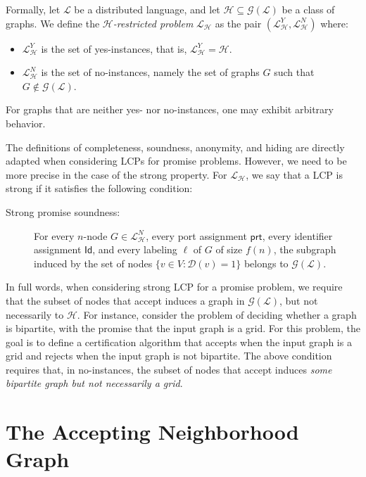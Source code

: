 \documentclass[11pt]{article}
\newcommand*{\ids}{\mathsf{Id}}
\newcommand*{\ports}{\mathsf{prt}}
\begin{document}
Formally, let $\mathcal{L}$ be a distributed language, and let $\mathcal{H}
\subseteq \mathcal{G}(\mathcal{L})$ be a class of graphs. 
We define the \emph{$\mathcal{H}$-restricted problem} $\mathcal{L}_\mathcal{H}$
as the pair $(\mathcal{L}_\mathcal{H}^Y, \mathcal{L}_\mathcal{H}^N)$ where:
\begin{itemize}
  \item $\mathcal{L}_\mathcal{H}^Y$ is the set of yes-instances, that is,
  $\mathcal{L}_\mathcal{H}^Y = \mathcal{H}$.
  \item $\mathcal{L}_\mathcal{H}^N$ is the set of no-instances, namely the set
  of graphs $G$ such that $G \notin \mathcal{G}(\mathcal{L})$.
\end{itemize}
For graphs that are neither yes- nor no-instances, one may exhibit arbitrary
behavior.

The definitions of completeness, soundness, anonymity, and hiding are directly adapted when considering LCPs for promise problems. However, we need to be more precise in the case of the strong property. For $\mathcal{L}_\mathcal{H}$, we say that a LCP is strong if it satisfies the following condition:
\begin{description}
  \item[Strong promise soundness:] For every $n$-node $G \in \mathcal{L}_\mathcal{H}^N$, every port assignment $\ports$, every identifier assignment $\ids$, and every labeling $\ell$ of $G$ of size $f(n)$, the subgraph induced by the set of nodes $\{v \in V : \mathcal{D}(v) = 1\}$ belongs to $\mathcal{G}(\mathcal{L})$.
\end{description}

In full words, when considering strong LCP for a promise problem, we require that the subset of nodes that accept induces a graph in $\mathcal{G}(\mathcal{L})$, but not necessarily to $\mathcal{H}$.  
For instance, consider the problem of deciding whether a graph is bipartite,
with the promise that the input graph is a grid. 
For this problem, the goal is to define a certification algorithm that accepts
when the input graph is a grid and rejects when the input graph is not
bipartite. 
The above condition requires that, in no-instances, the subset of nodes that
accept induces \emph{some bipartite graph but not necessarily a grid}.

\section{The Accepting Neighborhood Graph}
\label{sec:alvg}
\end{document}
